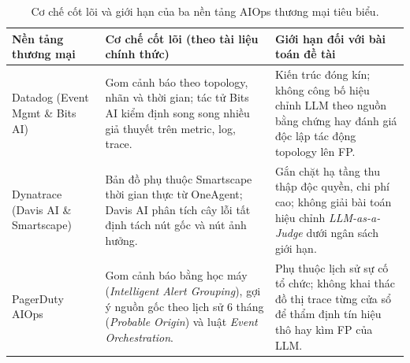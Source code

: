 \begin{table}[H]
  \centering
  \caption[Đối chiếu các nền tảng AIOps thương mại tiêu biểu]{Cơ chế cốt lõi và giới hạn của ba nền tảng AIOps thương mại tiêu biểu.}
  \label{tab:ch3-he-thong-tm}
  \tblfont
  \tblsetup
  \setlength{\tabcolsep}{4pt}
  \begin{tabularx}{\linewidth}{|>{\raggedright\arraybackslash}p{2.9cm}|Y|Y|}
    \hline
    \textbf{Nền tảng thương mại} & \textbf{Cơ chế cốt lõi (theo tài liệu chính thức)} & \textbf{Giới hạn đối với bài toán đề tài} \\
    \hline
    Datadog (Event Mgmt \& Bits AI)~\cite{datadog2026docs} & Gom cảnh báo theo topology, nhãn và thời gian; tác tử Bits AI kiểm định song song nhiều giả thuyết trên metric, log, trace. & Kiến trúc đóng kín; không công bố hiệu chỉnh LLM theo nguồn bằng chứng hay đánh giá độc lập tác động topology lên FP. \\
    \hline
    Dynatrace (Davis AI \& Smartscape)~\cite{dynatrace2026docs} & Bản đồ phụ thuộc Smartscape thời gian thực từ OneAgent; Davis AI phân tích cây lỗi tất định tách nút gốc và nút ảnh hưởng. & Gắn chặt hạ tầng thu thập độc quyền, chi phí cao; không giải bài toán hiệu chỉnh \emph{LLM-as-a-Judge} dưới ngân sách giới hạn. \\
    \hline
    PagerDuty AIOps~\cite{pagerduty2026docs} & Gom cảnh báo bằng học máy (\emph{Intelligent Alert Grouping}), gợi ý nguồn gốc theo lịch sử 6 tháng (\emph{Probable Origin}) và luật \emph{Event Orchestration}. & Phụ thuộc lịch sử sự cố tổ chức; không khai thác đồ thị trace từng cửa sổ để thẩm định tín hiệu thô hay kìm FP của LLM. \\
    \hline
  \end{tabularx}
\end{table}

